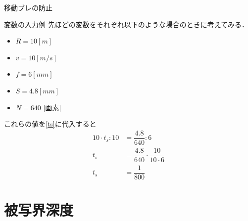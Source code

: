 \documentclass[8pt, jfont=ipaexm, t]{beamer} %
\begin{document}
\begin{frame}[allowframebreaks]{移動ブレの防止}
  \newpage

  \begin{exampleblock}{変数の入力例}
    先ほどの変数をそれぞれ以下のような場合のときに考えてみる．
    \begin{itemize}
      \item $R = 10[m]$
      \item $ v = 10[m/s]$
      \item $f = 6[mm]$
      \item $S = 4.8[mm]$
      \item $N = 640$ $[$画素$]$
    \end{itemize}
    これらの値を\eqref{ts}に代入すると
    \begin{align*}
      10 \cdot t_s : 10 &= \dfrac{4.8}{640} : 6 \\
      t_s &= \dfrac{4.8}{640} \cdot \dfrac{10}{10 \cdot 6} \\
      t_s &= \dfrac{1}{800}
    \end{align*}
  \end{exampleblock}
\end{frame}

\section{被写界深度}
\end{document}
